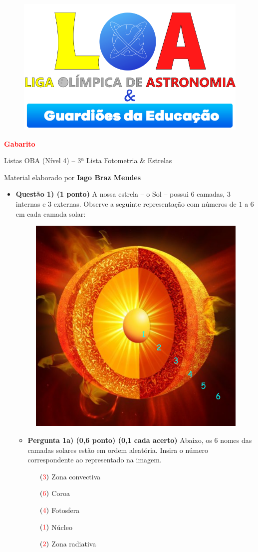 \documentclass[a4paper, 12pt]{article}
\newcommand{\red}[1]{\textcolor{red}{#1}}
\newcommand{\cabecalho}[4]
{
	\begin{figure}
		\centering
		\href{https://ligaolimpicadeastronomia.com.br/}{\includegraphics[scale=0.6]{./img/logos.png}}
	\end{figure}
	
	\begin{center}
		\begin{large}
			\textbf{#1}	
		\end{large}
			\linebreak Listas OBA (Nível 4) -- #2ª Lista
			\linebreak #3
		\end{center}
	
	\begin{flushright}
		Material elaborado por \textbf{#4}
	\end{flushright}
}
\begin{document}
	\cabecalho{\red{Gabarito}}{3}{Fotometria \& Estrelas}{Iago Braz Mendes}
	
	\begin{flushleft}
	\begin{itemize}
		\item \textbf{Questão 1) (1 ponto)} A nossa estrela -- o Sol -- possui 6 camadas, 3 internas e 3 externas. Observe a seguinte representação com números de $1$ a $6$ em cada camada solar:
			\begin{figure}[H]
				\centering
				\includegraphics[scale=0.6]{./img/1.png}
			\end{figure}
			\begin{itemize}
				\item \textbf{Pergunta 1a) (0,6 ponto) (0,1 cada acerto)} Abaixo, os 6 nomes das camadas solares estão em ordem aleatória. Insira o número correspondente ao representado na imagem.
					\begin{multicols}{2} \begin{itemize}
						\item[$(\red{3})$] Zona convectiva
						\item[$(\red{6})$] Coroa
						\item[$(\red{4})$] Fotosfera
						\item[$(\red{1})$] Núcleo
						\item[$(\red{2})$] Zona radiativa

\end{itemize}
\end{multicols}
\end{itemize}
\end{itemize}
\end{flushleft}
\end{document}
